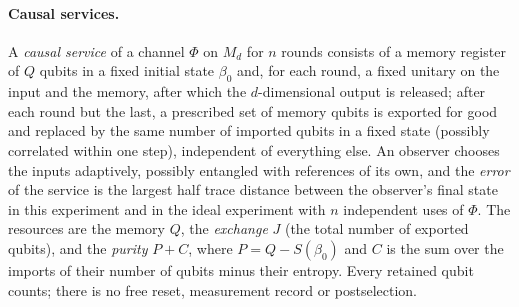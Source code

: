 \paragraph{Causal services.} A \emph{causal service} of a channel $\Phi$ on $M_d$ for $n$ rounds consists of a memory register of $Q$ qubits in a fixed
initial state $\beta_0$ and, for each round, a fixed unitary on the input and the memory, after which the $d$-dimensional output is released; after
each round but the last, a prescribed set of memory qubits is exported for good and replaced by the same number of imported qubits in a fixed
state (possibly correlated within one step), independent of everything else. An observer chooses the inputs adaptively, possibly entangled with references of its own, and the
\emph{error} of the service is the largest half trace distance between the observer's final state in this experiment and in the ideal experiment
with $n$ independent uses of $\Phi$. The resources are the memory $Q$, the \emph{exchange} $J$ (the total number of exported qubits), and the
\emph{purity} $P+C$, where $P=Q-S(\beta_0)$ and $C$ is the sum over the imports of their number of qubits minus their entropy. Every retained
qubit counts; there is no free reset, measurement record or postselection.

